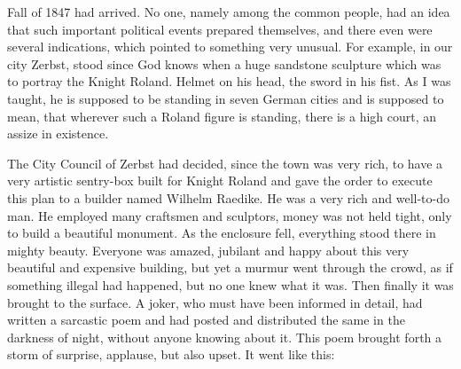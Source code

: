 \documentclass{article}
\begin{document}
Fall of 1847 had arrived. No one, namely among the common people, had an idea that such important political events prepared themselves, and there even were several indications, which pointed to something very unusual. For example, in our city Zerbst, stood since God knows when a huge sandstone sculpture which was to portray the Knight Roland. Helmet on his head, the sword in his fist. As I was taught, he is supposed to be standing in seven German cities and is supposed to mean, that wherever such a Roland figure is standing, there is a high court, an assize in existence.

The City Council of Zerbst had decided, since the town was very rich, to have a very artistic sentry-box built for Knight Roland and gave the order to execute this plan to a builder named Wilhelm Raedike. He was a very rich and well-to-do man. He employed many craftsmen and sculptors, money was not held tight, only to build a beautiful monument. As the enclosure fell, everything stood there in mighty beauty. Everyone was amazed, jubilant and happy about this very beautiful and expensive building, but yet a murmur went through the crowd, as if something illegal had happened, but no one knew what it was. Then finally it was brought to the surface. A joker, who must have been informed in detail, had written a sarcastic poem and had posted and distributed the same in the darkness of night, without anyone knowing about it. This poem brought forth a storm of surprise, applause, but also upset. It went like this:
\end{document}

